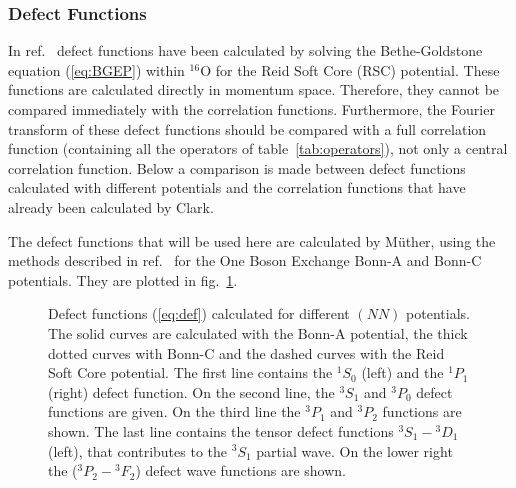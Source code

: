 \subsubsection{Defect Functions}
In ref.~\cite{MS93a} defect functions have been calculated by solving the 
Bethe-Goldstone equation (\ref{eq:BGEP}) within $^{16}$O for the Reid Soft 
Core 
(RSC) potential. These functions are calculated directly in momentum space. 
Therefore, they cannot be compared immediately with the correlation functions. 
Furthermore, the Fourier transform of these defect functions should be compared
with a full correlation function (containing all the operators of 
table~\ref{tab:operators}), not only a central correlation function. Below
a comparison is made between defect 
functions calculated with different potentials and the correlation functions
that have already been calculated by Clark\cite{Cl81}.

The defect functions that will be used here are calculated
by M\"uther\cite{MuPrive95}, using the methods described in ref.~\cite{MS93a} 
for the One Boson Exchange Bonn-A
 and Bonn-C\cite{MuPrive95,Ma89} potentials. They are
plotted in fig.~\ref{fig:defectAll}.
\begin{figure}
\centerline{%
\hspace{-1mm}%
}
\caption[]{Defect functions (\ref{eq:def}) calculated for different $(NN)$ 
potentials. The solid curves are calculated with the Bonn-A potential, the
thick dotted curves with Bonn-C and the dashed curves with the Reid Soft Core
potential. The first line contains the $^1S_0$ (left) and the $^1P_1$ (right) 
defect function. On the second line, the $^3S_1$ and $^3P_0$ defect functions
are given. On the third line the $^3P_1$ and $^3P_2$ functions are shown.
The last line contains the tensor defect functions ${^3S_1}-{^3D_1}$ (left), 
that contributes to the $^3S_1$ partial wave. On the lower
right the (${^3P_2}-{^3F_2}$) defect wave functions
are shown.
\label{fig:defectAll}
}
\end{figure}


